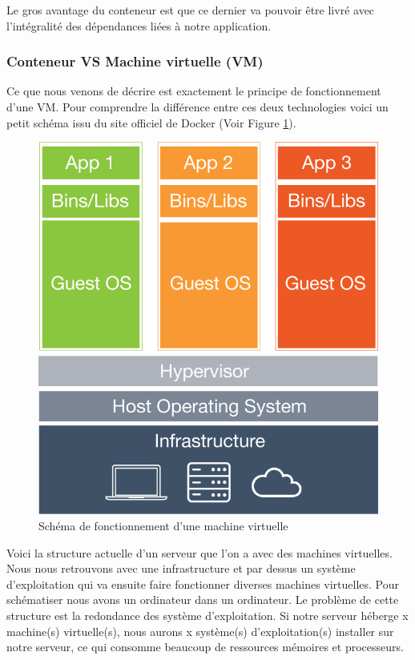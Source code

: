 \documentclass{report}
\begin{document}
        Le gros avantage du conteneur est que ce dernier va pouvoir être livré avec l’intégralité des dépendances liées à notre application.

        \subsubsection{Conteneur VS Machine virtuelle (VM)}
        Ce que nous venons de décrire est exactement le principe de fonctionnement d’une VM. Pour comprendre la différence entre ces deux technologies voici un petit schéma issu du site officiel de Docker (Voir Figure \ref{Virtual Machine}).

        \begin{figure}
          \begin{center}
            \includegraphics[scale=0.2]{images/virtualMachine.png}
          \end{center}
          \caption{Schéma de fonctionnement d'une machine virtuelle}
          \label{Virtual Machine}
        \end{figure}

        Voici la structure actuelle d’un serveur que l’on a avec des machines virtuelles. Nous nous retrouvons avec une infrastructure et par dessus un système d’exploitation qui va ensuite faire fonctionner diverses machines virtuelles. Pour schématiser nous avons un ordinateur dans un ordinateur. Le problème de cette structure est la redondance des système d’exploitation. Si notre serveur héberge x machine(s) virtuelle(s), nous aurons x système(s) d’exploitation(s) installer sur notre serveur, ce qui consomme beaucoup de ressources mémoires et processeurs.\\
\end{document}
